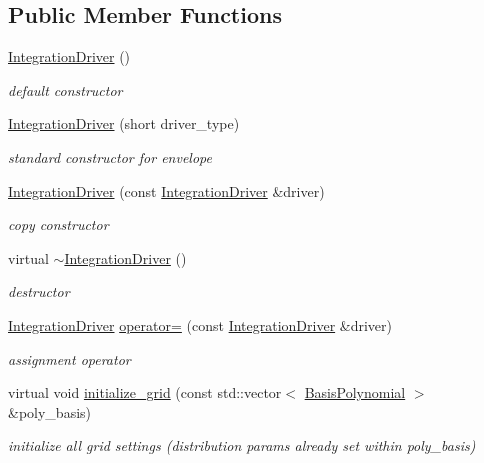 \subsection*{Public Member Functions}
\begin{DoxyCompactItemize}
\item 
\hyperlink{classPecos_1_1IntegrationDriver_af9a391517a476eb80874585a92fa68ba}{Integration\+Driver} ()
\begin{DoxyCompactList}\small\item\em default constructor \end{DoxyCompactList}\item 
\hyperlink{classPecos_1_1IntegrationDriver_a6767d009675093573bb221296e5dbbda}{Integration\+Driver} (short driver\+\_\+type)
\begin{DoxyCompactList}\small\item\em standard constructor for envelope \end{DoxyCompactList}\item 
\hyperlink{classPecos_1_1IntegrationDriver_aa971c023ca4719e4e984744f8aa1cfe4}{Integration\+Driver} (const \hyperlink{classPecos_1_1IntegrationDriver}{Integration\+Driver} \&driver)
\begin{DoxyCompactList}\small\item\em copy constructor \end{DoxyCompactList}\item 
virtual \hyperlink{classPecos_1_1IntegrationDriver_a626671e21974dde95474a2a0f80ffc39}{$\sim$\+Integration\+Driver} ()
\begin{DoxyCompactList}\small\item\em destructor \end{DoxyCompactList}\item 
\hyperlink{classPecos_1_1IntegrationDriver}{Integration\+Driver} \hyperlink{classPecos_1_1IntegrationDriver_a7a2037e44bf9f6373cfd1bd2e80654ae}{operator=} (const \hyperlink{classPecos_1_1IntegrationDriver}{Integration\+Driver} \&driver)
\begin{DoxyCompactList}\small\item\em assignment operator \end{DoxyCompactList}\item 
virtual void \hyperlink{classPecos_1_1IntegrationDriver_a4a1a63a0f30824fcd233da026bdebef6}{initialize\+\_\+grid} (const std\+::vector$<$ \hyperlink{classPecos_1_1BasisPolynomial}{Basis\+Polynomial} $>$ \&poly\+\_\+basis)
\begin{DoxyCompactList}\small\item\em initialize all grid settings (distribution params already set within poly\+\_\+basis) \end{DoxyCompactList}\item 

\end{DoxyCompactItemize}
